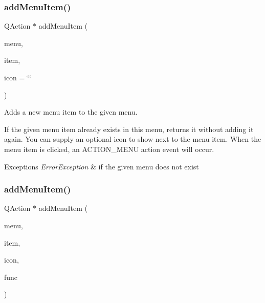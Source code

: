 \subsubsection{\texorpdfstring{add\+Menu\+Item()}{addMenuItem()}\hspace{0.1cm}{\footnotesize\ttfamily [1/4]}}
{\footnotesize\ttfamily Q\+Action $\ast$ add\+Menu\+Item (\begin{DoxyParamCaption}\item[{const std\+::string \&}]{menu,  }\item[{const std\+::string \&}]{item,  }\item[{const std\+::string \&}]{icon = {\ttfamily \char`\"{}\char`\"{}} }\end{DoxyParamCaption})\hspace{0.3cm}{\ttfamily [virtual]}}



Adds a new menu item to the given menu. 

If the given menu item already exists in this menu, returns it without adding it again. You can supply an optional icon to show next to the menu item. When the menu item is clicked, an A\+C\+T\+I\+O\+N\+\_\+\+M\+E\+NU action event will occur. 
\begin{DoxyExceptions}{Exceptions}
{\em Error\+Exception} & if the given menu does not exist \\
\hline
\end{DoxyExceptions}
\mbox{\label{classGWindow_ad57e2955efbfb5a0cccc981332945c8e}} 
\subsubsection{\texorpdfstring{add\+Menu\+Item()}{addMenuItem()}\hspace{0.1cm}{\footnotesize\ttfamily [2/4]}}
{\footnotesize\ttfamily Q\+Action $\ast$ add\+Menu\+Item (\begin{DoxyParamCaption}\item[{const std\+::string \&}]{menu,  }\item[{const std\+::string \&}]{item,  }\item[{const std\+::string \&}]{icon,  }\item[{G\+Event\+Listener\+Void}]{func }\end{DoxyParamCaption})\hspace{0.3cm}{\ttfamily [virtual]}}



